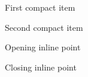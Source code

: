 \documentclass{article}
\begin{document}
\begin{itemize*}
\item First compact item
\item Second compact item
\end{itemize*}
\begin{enumerate*}
\item Opening inline point
\item Closing inline point
\end{enumerate*}
\end{document}
